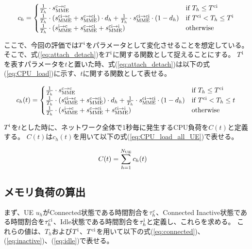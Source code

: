 \documentclass[a4j]{ujarticle}
\begin{document}
\begin{equation}
  c_h  =
  \begin{cases}
		\frac{1}{T_h} \cdot s_{\rm MME}^{\rm c \to \rm c} & \text{if $T_h \le T^{\rm ci}$} \\
    \frac{1}{T_h} \cdot (s_{\rm MME}^{\rm ci \to \rm c} + s_{\rm MME}^{\rm c \to \rm ci}) \cdot d_h  + \frac{1}{T_h} \cdot s_{\rm MME}^{\rm ci \to \rm ci} \cdot (1 - d_h) & \text{if $T^{\rm ci} < T_h \le T^{\rm i}$} \\
    \frac{1}{T_h} \cdot (s_{\rm MME}^{\rm i \to \rm c} + s_{\rm MME}^{\rm c \to \rm ci} + s_{\rm MME}^{\rm ci \to \rm i}) & \text{otherwise}
  \end{cases}
  \label{eq:attach_detach}
\end{equation}

ここで、今回の評価では$T^{\rm i}$をパラメータとして変化させることを想定している。
そこで、式(\ref{eq:attach_detach})を$T^{\rm i}$に関する関数として捉えることにする。
$T^{\rm i}$を表すパラメータを$t$と置いた時、式(\ref{eq:attach_detach})は以下の式(\ref{eq:CPU_load})に示す、$t$に関する関数として表せる。

\begin{equation}
  c_h(t)  =
  \begin{cases}
		\frac{1}{T_h} \cdot s_{\rm MME}^{\rm c \to \rm c} & \text{if $T_h \le T^{\rm ci}$} \\
    \frac{1}{T_h} \cdot (s_{\rm MME}^{\rm ci \to \rm c} + s_{\rm MME}^{\rm c \to \rm ci}) \cdot d_h  + \frac{1}{T_h} \cdot s_{\rm MME}^{\rm ci \to \rm ci} \cdot (1 - d_h) & \text{if $T^{\rm ci} < T_h \le t $} \\
    \frac{1}{T_h} \cdot (s_{\rm MME}^{\rm i \to \rm c} + s_{\rm MME}^{\rm c \to \rm ci} + s_{\rm MME}^{\rm ci \to \rm i}) & \text{otherwise}
  \end{cases}
  \label{eq:CPU_load}
\end{equation}

$T^{\rm i}$を$t$とした時に、ネットワーク全体で1秒毎に発生するCPU負荷を$C(t)$と定義する。
$C(t)$は$c_h(t)$を用いて以下の式(\ref{eq:CPU_load_all_UE})で表せる。

\begin{eqnarray}
\begin{split}
  C(t) &= \sum_{h = 1}^{N_{\rm UE}} c_h(t) \label{eq:CPU_load_all_UE}
\end{split}
\end{eqnarray}



\subsection{メモリ負荷の算出}
\label{sec:memory}
まず、UE $u_h$がConnected状態である時間割合を$\tau^{\rm c}_h$、Connected Inactive状態である時間割合を$\tau^{\rm ci}_h$、Idle状態である時間割合を$\tau^{\rm i}_h$と定義し、これらを求める。
これらの値は、$T_h$および$T^{\rm i}$、$T^{\rm ci}$を用いて以下の式(\ref{eq:connected})、(\ref{eq:inactive})、(\ref{eq:idle})で表せる。
\end{document}
